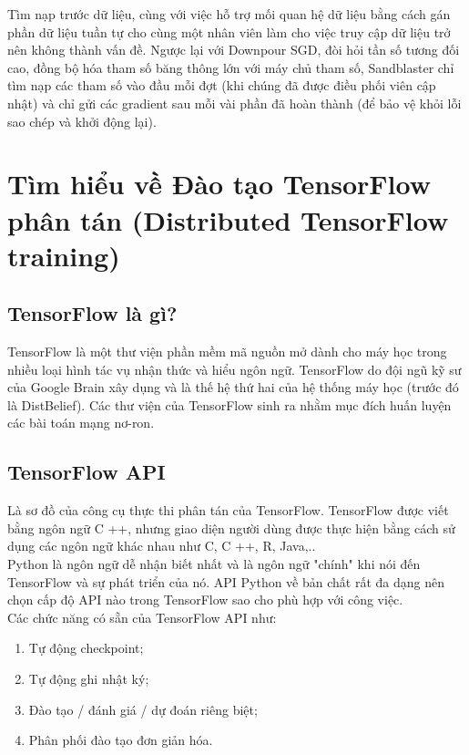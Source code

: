\documentclass[11pt,a4paper]{article}
\numberwithin{equation}{subsection}
\numberwithin{figure}{subsection}
\numberwithin{table}{subsection}
\begin{document}
Tìm nạp trước dữ liệu, cùng với việc hỗ trợ mối quan hệ dữ liệu bằng cách gán  phần dữ liệu tuần tự cho cùng một nhân viên làm cho việc truy cập dữ liệu trở nên không thành vấn đề. Ngược lại với Downpour SGD, đòi hỏi tần số tương đối cao, đồng bộ hóa tham số băng thông lớn với máy chủ tham số, Sandblaster chỉ tìm nạp các tham số vào đầu mỗi đợt (khi chúng đã được điều phối viên cập nhật) và chỉ gửi các gradient sau mỗi vài phần đã hoàn thành (để bảo vệ khỏi lỗi sao chép và khởi động lại).

\newpage
\section{Tìm hiểu về Đào tạo TensorFlow phân tán (Distributed TensorFlow training) }

\subsection{TensorFlow là gì?}
TensorFlow là một thư viện phần mềm mã nguồn mở dành cho máy học trong nhiều loại hình tác vụ nhận thức và hiểu ngôn ngữ. TensorFlow do đội ngũ kỹ sư của  Google Brain xây dụng và là thế hệ thứ hai của hệ thống máy học (trước đó là DistBelief). Các thư viện của TensorFlow sinh ra nhằm mục đích huấn luyện các bài toán mạng nơ-ron.

\subsection{TensorFlow API}
Là sơ đồ của công cụ thực thi phân tán của TensorFlow. TensorFlow được viết bằng ngôn ngữ C ++, nhưng giao diện người dùng được thực hiện bằng cách sử dụng các ngôn ngữ khác nhau như C, C ++, R, Java,..\\

Python là ngôn ngữ dễ nhận biết nhất và là ngôn ngữ "chính" khi nói đến TensorFlow và sự phát triển của nó. API Python về bản chất rất đa dạng nên chọn cấp độ API nào trong TensorFlow sao cho phù hợp với công việc.\\

Các chức năng có sẵn của TensorFlow API như:
\begin{enumerate}[-]
	\item Tự động checkpoint;
	\item Tự động ghi nhật ký;
	\item Đào tạo / đánh giá / dự đoán riêng biệt;
	\item Phân phối đào tạo đơn giản hóa.
\end{enumerate}
\end{document}
